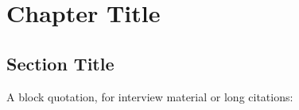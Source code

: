 
\chapter{Chapter Title}
\label{ch:study-two}


\blindtext

\section{Section Title}
\label{sec:study-two-01}

\blindtext[2]

A block quotation, for interview material or long citations:

\begin{quote}
  \blindtext[1]
\end{quote}

\blindtext
